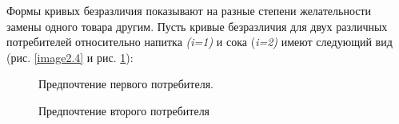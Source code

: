 \documentclass[12pt, 4paper]{book}
\begin{document}
{Формы кривых безразличия показывают на разные степени желательности замены одного товара другим. Пусть кривые безразличия для двух различных потребителей относительно напитка \textit{(i=1)} и сока (\textit{i=2)} имеют следующий вид (рис. \ref{image2.4} и рис. \ref{image2.5}): 
\par
\begin{figure}[h]
	\begin{minipage}[h]{0.49\linewidth}
		\caption{Предпочтение первого потребителя.} %
		\label{image2.4} %
	\end{minipage}
	\hfill
	\begin{minipage}[h]{0.49\linewidth}
		\caption{Предпочтение второго потребителя} %
		\label{image2.5} %
	\end{minipage}
	

\end{figure}}
\end{document}
